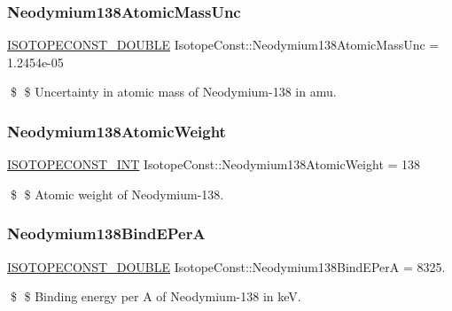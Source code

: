\subsubsection{\texorpdfstring{Neodymium138\+Atomic\+Mass\+Unc}{Neodymium138AtomicMassUnc}}
{\footnotesize\ttfamily \mbox{\hyperlink{group___isotope_const-_macros_ga8f45a7272ce02c0b4c65c44636ed719a}{I\+S\+O\+T\+O\+P\+E\+C\+O\+N\+S\+T\+\_\+\+D\+O\+U\+B\+LE}} Isotope\+Const\+::\+Neodymium138\+Atomic\+Mass\+Unc = 1.\+2454e-\/05}

\$ \$ Uncertainty in atomic mass of Neodymium-\/138 in amu. \mbox{\label{group___isotope_const-_neodymium-_nd138_ga9a1e5721dac0eb503fa955b8e1f1f4f3}} 
\subsubsection{\texorpdfstring{Neodymium138\+Atomic\+Weight}{Neodymium138AtomicWeight}}
{\footnotesize\ttfamily \mbox{\hyperlink{group___isotope_const-_macros_ga5f18360b3e99483a35c32d789e62621c}{I\+S\+O\+T\+O\+P\+E\+C\+O\+N\+S\+T\+\_\+\+I\+NT}} Isotope\+Const\+::\+Neodymium138\+Atomic\+Weight = 138}

\$ \$ Atomic weight of Neodymium-\/138. \mbox{\label{group___isotope_const-_neodymium-_nd138_ga5a2c9959d772ce1b356ebd9158945201}} 
\subsubsection{\texorpdfstring{Neodymium138\+Bind\+E\+PerA}{Neodymium138BindEPerA}}
{\footnotesize\ttfamily \mbox{\hyperlink{group___isotope_const-_macros_ga8f45a7272ce02c0b4c65c44636ed719a}{I\+S\+O\+T\+O\+P\+E\+C\+O\+N\+S\+T\+\_\+\+D\+O\+U\+B\+LE}} Isotope\+Const\+::\+Neodymium138\+Bind\+E\+PerA = 8325.}

\$ \$ Binding energy per A of Neodymium-\/138 in keV. \mbox{\label{group___isotope_const-_neodymium-_nd138_ga558e52135f2eec256a53b4ef5c838b9f}} 

